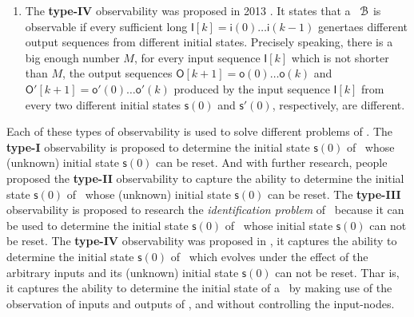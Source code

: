 \begin{enumerate}
\item  The  {\bf type-IV}  observability was  proposed in 2013 \cite{Fornasini2013Observability}. It states that a \BCN\ ${\mathcal{B}}$ is observable if every sufficient long $\mathsf{I}[k]=\mathsf{i}(0)\ldots\mathsf{i}(k-1)$ genertaes different output sequences  from different initial states. Precisely speaking, there is a big enough number $M$, for every  input sequence $\mathsf{I}[k]$ which is not shorter than $M$, the output sequences $\mathsf{O}[k+1]=\mathsf{o}(0) \ldots\mathsf{o}(k)$ and  $\mathsf{O}'[k+1]=\mathsf{o}'(0)\ldots\mathsf{o}'(k)$ produced by the input sequence $\mathsf{I}[k]$ from every two different initial states $\mathsf{s}(0)$ and $\mathsf{s}'(0)$, respectively, are different.
\end{enumerate}

Each of these types of observability is used to solve different problems of \BCNs. The {\bf type-I}  observability is proposed to determine the initial state $\mathsf{s}(0)$ of \BCN\ whose (unknown) initial state $\mathsf{s}(0)$ can be reset. %
 And with further research, people proposed the {\bf type-II} observability to capture the ability to determine the initial state $\mathsf{s}(0)$ of \BCN\ whose (unknown) initial state $\mathsf{s}(0)$ can be reset. The {\bf type-III} observability is proposed to research the {\em identification problem} of \BCN\ because it can be used to determine the initial state $\mathsf{s}(0)$ of \BCN\ whose initial state $\mathsf{s}(0)$ can not be reset. The {\bf type-IV} observability was proposed in  \cite{Fornasini2013Observability}, it captures the ability to determine the initial state $\mathsf{s}(0)$ of \BCN\ which evolves under the effect of the arbitrary inputs and its (unknown) initial state $\mathsf{s}(0)$ can not be reset. Thar is, it captures the ability to determine the initial state of a \BCN\ by making use of the observation of inputs and outputs of \BCN, and without controlling the input-nodes.%

